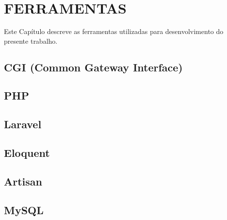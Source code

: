 
\chapter{FERRAMENTAS}
Este Capítulo descreve as ferramentas utilizadas para desenvolvimento do presente trabalho.

\section{CGI (Common Gateway Interface)}


\section{PHP}


\newpage
\section{Laravel}


\section{Eloquent}


\section{Artisan}


\section{MySQL}


%